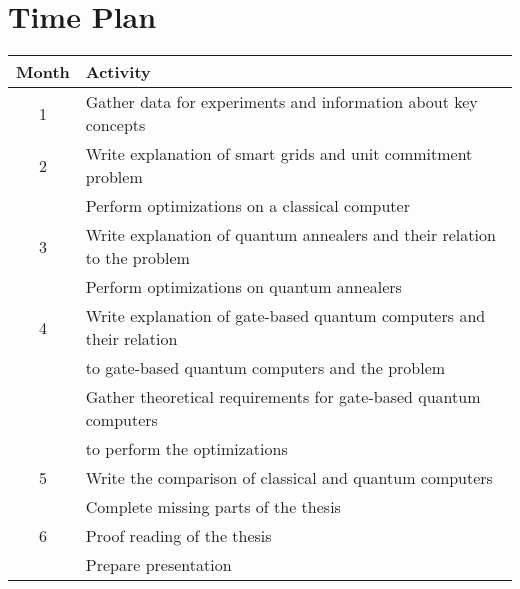 \section{Time Plan}

\begin{table}[h!]
\begin{center}
  \begin{tabular}{|| c | l ||}
    \hline
    Month & Activity \\
    \hline \hline
    1 & Gather data for experiments and information about key concepts \\ \hline
    2 & Write explanation of smart grids and unit commitment problem \\
    & Perform optimizations on a classical computer \\ \hline
    3 & Write explanation of quantum annealers and their relation to the problem \\
    & Perform optimizations on quantum annealers \\ \hline
    4 & Write explanation of gate-based quantum computers and their relation \\
    & to gate-based quantum computers and the problem \\
    & Gather theoretical requirements for gate-based quantum computers \\
    & to perform the optimizations \\ \hline
    5 & Write the comparison of classical and quantum computers \\
    & Complete missing parts of the thesis \\ \hline
    6 & Proof reading of the thesis \\
    & Prepare presentation \\ \hline
  \end{tabular}
\end{center}
\end{table}
